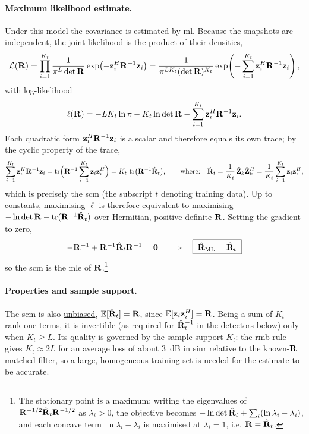 \documentclass{article}
\begin{document}
\paragraph{Maximum likelihood estimate.}
Under this model the covariance is estimated by \gls{ml}. Because the snapshots are independent, the joint likelihood is the product of their densities,
$$\mathcal{L}(\mathbf{R})=\prod_{i=1}^{K_t}\frac{1}{\pi^L\det\mathbf{R}}
   \exp\!\left(-\vb z_i^H\mathbf{R}^{-1}\vb z_i\right)
  =\frac{1}{\pi^{LK_t}(\det\mathbf{R})^{K_t}}
   \exp\!\left(-\sum_{i=1}^{K_t}\vb z_i^H\mathbf{R}^{-1}\vb z_i\right),$$
with log-likelihood
$$\ell(\mathbf{R})=-LK_t\ln\pi-K_t\ln\det\mathbf{R}-\sum_{i=1}^{K_t}\vb z_i^H\mathbf{R}^{-1}\vb z_i.$$
Each quadratic form $\vb z_i^H\mathbf{R}^{-1}\vb z_i$ is a scalar and therefore equals its own trace; by the cyclic property of the trace,
$$\sum_{i=1}^{K_t}\vb z_i^H\mathbf{R}^{-1}\vb z_i
   =\operatorname{tr}\!\Big(\mathbf{R}^{-1}\sum_{i=1}^{K_t}\vb z_i\vb z_i^H\Big)
   =K_t\,\operatorname{tr}\!\big(\mathbf{R}^{-1}\hat{\mathbf{R}}_t\big),
   \qquad \text{where:} \quad
   \hat{\mathbf{R}}_t=\frac{1}{K_t}\,\tilde{\mathbf{Z}}_k\tilde{\mathbf{Z}}_k^H
   =\frac{1}{K_t}\sum_{i=1}^{K_t}\vb z_i\vb z_i^H,$$
which is precisely the \gls{scm} (the subscript $t$ denoting training data). Up to constants, maximising $\ell$ is therefore equivalent to maximising $-\ln\det\mathbf{R}-\operatorname{tr}(\mathbf{R}^{-1}\hat{\mathbf{R}}_t)$ over Hermitian, positive-definite $\mathbf{R}$.
Setting the gradient to zero,
$$-\mathbf{R}^{-1}+\mathbf{R}^{-1}\hat{\mathbf{R}}_t\mathbf{R}^{-1}=\mathbf{0}
  \quad\Longrightarrow\quad
  \boxed{\;\hat{\mathbf{R}}_{\mathrm{ML}}=\hat{\mathbf{R}}_t\;}$$
so the \gls{scm} is the \gls{mle} of $\mathbf{R}$.\footnote{The stationary point is a maximum: writing the eigenvalues of $\mathbf{R}^{-1/2}\hat{\mathbf{R}}_t\mathbf{R}^{-1/2}$ as $\lambda_i>0$, the objective becomes $-\ln\det\hat{\mathbf{R}}_t+\sum_i(\ln\lambda_i-\lambda_i)$, and each concave term $\ln\lambda_i-\lambda_i$ is maximised at $\lambda_i=1$, i.e. $\mathbf{R}=\hat{\mathbf{R}}_t$.}

\paragraph{Properties and sample support.}
The \gls{scm} is also \underline{unbiased}, $\mathbb{E}[\hat{\mathbf{R}}_t]=\mathbf{R}$, since $\mathbb{E}[\vb z_i\vb z_i^H]=\mathbf{R}$. Being a sum of $K_t$ rank-one terms, it is invertible (as required for $\hat{\mathbf{R}}_t^{-1}$ in the detectors below) only when $K_t\ge L$. Its quality is governed by the sample support $K_t$: the \gls{rmb} rule gives $K_t\approx 2L$ for an average loss of about $3$~dB in \gls{sinr} relative to the known-$\mathbf{R}$ matched filter, so a large, homogeneous training set is needed for the estimate to be accurate.
\end{document}
